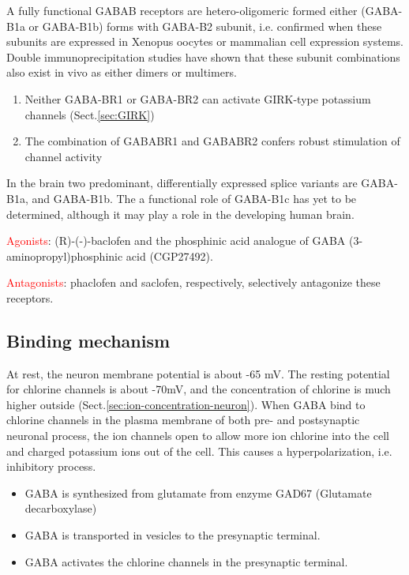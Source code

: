 A fully functional GABAB receptors are  hetero-oligomeric formed either
(GABA-B1a or GABA-B1b) forms with GABA-B2 subunit, i.e. confirmed when these
subunits are expressed in Xenopus oocytes or mammalian cell expression systems.
Double immunoprecipitation studies have shown that these subunit combinations
also exist in vivo as either dimers or multimers.
\begin{enumerate}
  \item  Neither GABA-BR1 or GABA-BR2 can activate GIRK-type potassium
  channels (Sect.\ref{sec:GIRK})
  
  \item The   combination of GABABR1 and GABABR2 confers robust stimulation of
  channel activity
  
  
\end{enumerate}

In the brain two predominant, differentially expressed splice variants
are GABA-B1a, and GABA-B1b. The a functional role of GABA-B1c has yet to be
determined, although it may play a role in the developing human brain.

\textcolor{red}{Agonists}:  (R)-(-)-baclofen and the phosphinic acid analogue of
GABA (3- aminopropyl)phosphinic acid (CGP27492).

\textcolor{red}{Antagonists}: phaclofen and saclofen, respectively, selectively
antagonize these receptors.



\subsection{Binding mechanism}

At rest, the neuron membrane potential is about -65 mV. The resting potential
for chlorine channels is about -70mV, and the concentration of chlorine is much
higher outside (Sect.\ref{sec:ion-concentration-neuron}).
When GABA bind to chlorine channels in the plasma membrane of both pre- and
postsynaptic neuronal process, the ion channels open to allow more ion chlorine
into the cell and charged potassium ions out of the cell. This causes a
hyperpolarization, i.e. inhibitory process.

\begin{itemize}
  \item GABA is synthesized from glutamate from enzyme GAD67 (Glutamate
  decarboxylase)
  \item GABA is transported in vesicles to the presynaptic terminal.
  \item GABA activates the chlorine channels in the presynaptic terminal.
\end{itemize}

